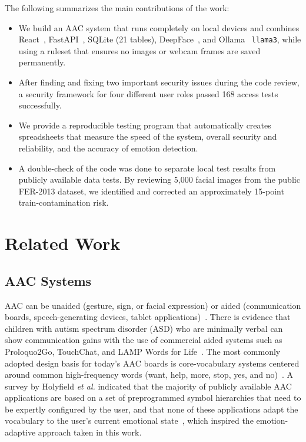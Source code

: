 \documentclass[conference]{IEEEtran}
\begin{document}
The following summarizes the main contributions of the work:
\begin{itemize}
  \item We build an AAC system that runs completely on local devices and combines React~\cite{b16}, FastAPI~\cite{b15}, SQLite (21 tables), DeepFace~\cite{b6}, and Ollama~\cite{b10} \texttt{llama3}, while using a ruleset that ensures no images or webcam frames are saved permanently.
  \item After finding and fixing two important security issues during the code review, a security framework for four different user roles passed 168 access tests successfully.
  \item We provide a reproducible testing program that automatically creates spreadsheets that measure the speed of the system, overall security and reliability, and the accuracy of emotion detection.
  \item A double-check of the code was done to separate local test results from publicly available data tests. By reviewing 5{,}000 facial images from the public FER-2013 dataset, we identified and corrected an approximately 15-point train-contamination risk.
\end{itemize}

\section{Related Work}
\subsection{AAC Systems}
AAC can be unaided (gesture, sign, or facial expression) or aided (communication boards, speech-generating devices, tablet applications)~\cite{b1}. There is evidence that children with autism spectrum disorder (ASD) who are minimally verbal can show communication gains with the use of commercial aided systems such as Proloquo2Go, TouchChat, and LAMP Words for Life~\cite{b1,b2}. The most commonly adopted design basis for today's AAC boards is core-vocabulary systems centered around common high-frequency words (want, help, more, stop, yes, and no)~\cite{b3}. A survey by Holyfield \emph{et al.} indicated that the majority of publicly available AAC applications are based on a set of preprogrammed symbol hierarchies that need to be expertly configured by the user, and that none of these applications adapt the vocabulary to the user's current emotional state~\cite{b4}, which inspired the emotion-adaptive approach taken in this work.
\end{document}

